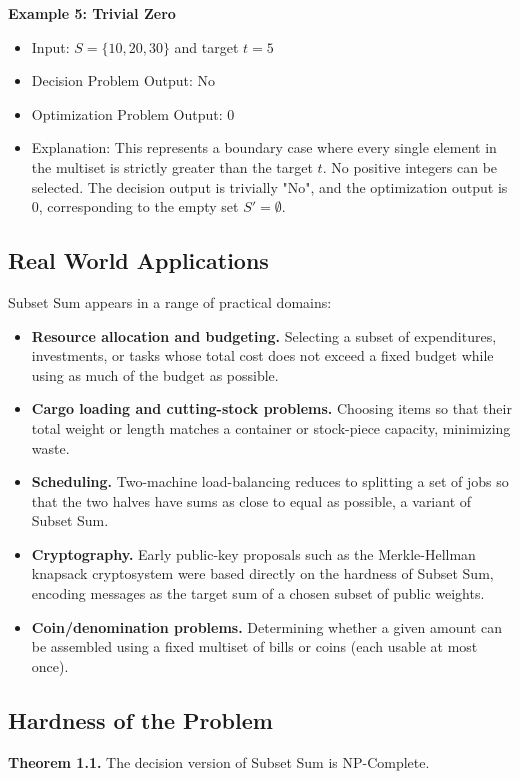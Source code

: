 \documentclass[12pt,a4paper]{article}
\begin{document}
\textbf{Example 5: Trivial Zero}
\begin{itemize}
\item Input: $S = \{10, 20, 30\}$ and target $t = 5$
\item Decision Problem Output: No
\item Optimization Problem Output: 0
\item Explanation: This represents a boundary case where every single element in the multiset is strictly greater than the target $t$. No positive integers can be selected. The decision output is trivially "No", and the optimization output is 0, corresponding to the empty set $S' = \emptyset$.
\end{itemize}

\subsection{Real World Applications}
Subset Sum appears in a range of practical domains:

\begin{itemize}
\item \textbf{Resource allocation and budgeting.} Selecting a subset of expenditures, investments, or tasks whose total cost does not exceed a fixed budget while using as much of the budget as possible.
\item \textbf{Cargo loading and cutting-stock problems.} Choosing items so that their total weight or length matches a container or stock-piece capacity, minimizing waste.
\item \textbf{Scheduling.} Two-machine load-balancing reduces to splitting a set of jobs so that the two halves have sums as close to equal as possible, a variant of Subset Sum.
\item \textbf{Cryptography.} Early public-key proposals such as the Merkle-Hellman knapsack cryptosystem were based directly on the hardness of Subset Sum, encoding messages as the target sum of a chosen subset of public weights.
\item \textbf{Coin/denomination problems.} Determining whether a given amount can be assembled using a fixed multiset of bills or coins (each usable at most once).
\end{itemize}

\subsection{Hardness of the Problem}

\textbf{Theorem 1.1.} The decision version of Subset Sum is NP-Complete.
\end{document}
